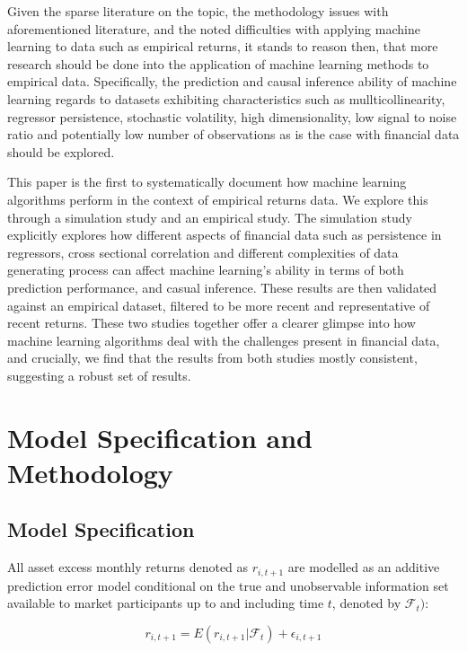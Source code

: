 \documentclass[11pt, a4paper, table]{article}
\begin{document}
Given the sparse literature on the topic, the methodology issues with aforementioned literature, and the noted difficulties with applying machine learning to data such as empirical returns, it stands to reason then, that more research should be done into the application of machine learning methods to empirical data. Specifically, the prediction and causal inference ability of machine learning regards to datasets exhibiting characteristics such as mullticollinearity, regressor persistence, stochastic volatility, high dimensionality, low signal to noise ratio and potentially low number of observations as is the case with financial data should be explored.

This paper is the first to systematically document how machine learning algorithms perform in the context of empirical returns data. We explore this through a simulation study and an empirical study. The simulation study explicitly explores how different aspects of financial data such as persistence in regressors, cross sectional correlation and different complexities of data generating process can affect machine learning's ability in terms of both prediction performance, and casual inference. These results are then validated against an empirical dataset, filtered to be more recent and representative of recent returns. These two studies together offer a clearer glimpse into how machine learning algorithms deal with the challenges present in financial data, and crucially, we find that the results from both studies mostly consistent, suggesting a robust set of  results.


\section{Model Specification and Methodology}

\subsection{Model Specification}

All asset excess monthly returns denoted as $r_{i, t+1}$ are modelled as an additive prediction error model conditional on the true and unobservable information set available to market participants up to and including time $t$, denoted by $\mathcal{F}_t)$:

\begin{equation}
	r_{i, t+1} = E(r_{i, t+1} | \mathcal{F}_t) + \epsilon_{i, t+1}
\end{equation}
\end{document}
